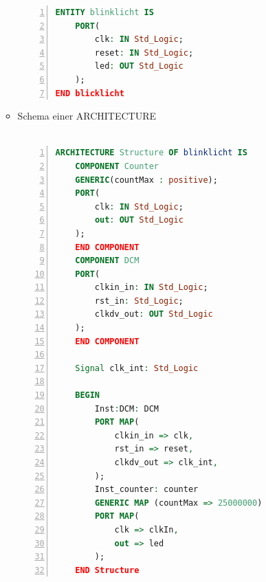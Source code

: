 \begin{itemize}
\begin{itemize}
\begin{minipage}{\linewidth}
\begin{lstlisting}[frame=single,numbers=left,mathescape,language=VHDL,tabsize=4]
ENTITY blinklicht IS
	PORT(
		clk: IN Std_Logic;
		reset: IN Std_Logic;
		led: OUT Std_Logic
	);
END blicklicht
			\end{lstlisting}
			\end{minipage}
		\item Schema einer ARCHITECTURE\\\\
			\begin{minipage}{\linewidth}
			\begin{lstlisting}[frame=single,numbers=left,mathescape,language=VHDL,tabsize=4]
ARCHITECTURE Structure OF blinklicht IS
	COMPONENT Counter
	GENERIC(countMax : positive);
	PORT(
		clk: IN Std_Logic;
		out: OUT Std_Logic
	);
	END COMPONENT
	COMPONENT DCM
	PORT(
		clkin_in: IN Std_Logic;
		rst_in: Std_Logic;
		clkdv_out: OUT Std_Logic
	);
	END COMPONENT

	Signal clk_int: Std_Logic

	BEGIN
		Inst:DCM: DCM
		PORT MAP(
			clkin_in => clk,
			rst_in => reset,
			clkdv_out => clk_int,
		);
		Inst_counter: counter
		GENERIC MAP (countMax => 25000000)
		PORT MAP(
			clk => clkIn,
			out => led
		);
	END Structure
			\end{lstlisting}
			\end{minipage}
	\end{itemize}
\end{itemize}


